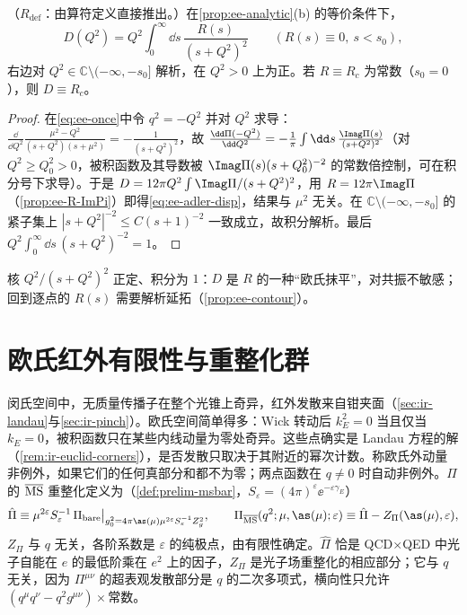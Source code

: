 \begin{proposition}\label{prop:ee-adler-dispersion}
（$R_{\mathrm{def}}$：由算符定义直接推出。）在\cref{prop:ee-analytic}(b) 的等价条件下，
\begin{equation}\label{eq:ee-adler-disp}
D(Q^2)=Q^2\int_0^\infty\!\dd s\,\frac{R(s)}{(s+Q^2)^2}\qquad(R(s)\equiv0,\ s<s_0),
\end{equation}
右边对 $Q^2\in\mathbb C\setminus(-\infty,-s_0]$ 解析，在 $Q^2>0$ 上为正。若 $R\equiv R_c$ 为常数（$s_0=0$），则 $D\equiv R_c$。
\end{proposition}
\begin{proof}
在\cref{eq:ee-once}中令 $q^2=-Q^2$ 并对 $Q^2$ 求导：$\frac{\dd}{\dd Q^2}\frac{\mu^2-Q^2}{(s+Q^2)(s+\mu^2)}=-\frac{1}{(s+Q^2)^2}$，故 $\frac{\dd\Pi(-Q^2)}{\dd Q^2}=-\frac1\pi\int\dd s\,\frac{\Imag\Pi(s)}{(s+Q^2)^2}$（对 $Q^2\ge Q_0^2>0$，被积函数及其导数被 $\Imag\Pi(s)(s+Q_0^2)^{-2}$ 的常数倍控制，可在积分号下求导）。于是 $D=12\pi Q^2\int\Imag\Pi/(s+Q^2)^2$，用 $R=12\pi\Imag\Pi$（\cref{prop:ee-R-ImPi}）即得\cref{eq:ee-adler-disp}，结果与 $\mu^2$ 无关。在 $\mathbb C\setminus(-\infty,-s_0]$ 的紧子集上 $|s+Q^2|^{-2}\le C(s+1)^{-2}$ 一致成立，故积分解析。最后 $Q^2\int_0^\infty\dd s\,(s+Q^2)^{-2}=1$。
\end{proof}
核 $Q^2/(s+Q^2)^2$ 正定、积分为 $1$：$D$ 是 $R$ 的一种“欧氏抹平”，对共振不敏感；回到逐点的 $R(s)$ 需要解析延拓（\cref{prop:ee-contour}）。

\section{欧氏红外有限性与重整化群}\label{sec:ee-euclid}

闵氏空间中，无质量传播子在整个光锥上奇异，红外发散来自钳夹面（\cref{sec:ir-landau}与\cref{sec:ir-pinch}）。欧氏空间简单得多：Wick 转动后 $k_E^2=0$ 当且仅当 $k_E=0$，被积函数只在某些内线动量为零处奇异。这些点确实是 Landau 方程的解（\cref{rem:ir-euclid-corners}），是否发散只取决于其附近的幂次计数。称欧氏外动量非例外，如果它们的任何真部分和都不为零；两点函数在 $q\ne0$ 时自动非例外。$\Pi$ 的 $\overline{\rm MS}$ 重整化定义为（\cref{def:prelim-msbar}，$S_\varepsilon=(4\pi)^\varepsilon\ee^{-\varepsilon\gamma_E}$）
\begin{equation}\label{eq:ee-PiMS}
\hat\Pi\equiv\mu^{2\varepsilon}S_\varepsilon^{-1}\,\Pi_{\rm bare}\big|_{g_0^2=4\pi\as(\mu)\mu^{2\varepsilon}S_\varepsilon^{-1}Z_g^2},\qquad
\Pi_{\overline{\rm MS}}(q^2;\mu,\as(\mu);\varepsilon)\equiv\hat\Pi-Z_\Pi(\as(\mu),\varepsilon),
\end{equation}
$Z_\Pi$ 与 $q$ 无关，各阶系数是 $\varepsilon$ 的纯极点，由有限性确定。$\hat\Pi$ 恰是 QCD$\times$QED 中光子自能在 $e$ 的最低阶乘在 $e^2$ 上的因子，$Z_\Pi$ 是光子场重整化的相应部分；它与 $q$ 无关，因为 $\Pi^{\mu\nu}$ 的超表观发散部分是 $q$ 的二次多项式，横向性只允许 $(q^\mu q^\nu-q^2g^{\mu\nu})\times$常数。

